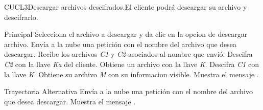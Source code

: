 
\begin{UseCase}{CUCL3}{Descargar archivos descifrados.}{El cliente podrá descargar su archivo y descifrarlo.}

\end{UseCase}


\begin{UCtrayectoria}{Principal}
\UCpaso [\UCactor] Selecciona el archivo a descargar y da clic en la opcion de descargar archivo.
\UCpaso [\UCactor] Envía a la nube una petición con el nombre del archivo que desea descargar.
\UCpaso Recibe los archivos \textit{C1} y \textit{C2} asociados al nombre que envió.
\UCpaso Descifra \textit{C2} con la llave \textit{Ka} del cliente.
\UCpaso Obtiene un archivo con la llave \textit{K}.
\UCpaso Descifra \textit{C1} con la llave \textit{K}.
\UCpaso Obtiene su archivo \textit{M} con su informacion visible.
\UCpaso Muestra el mensaje .
\end{UCtrayectoria}

\begin{UCtrayectoria}{Trayectoria Alternativa}
\UCpaso [\UCactor] Envía a la nube una petición con el nombre del archivo que desea descargar.
\UCpaso Muestra el mensaje .\end{UCtrayectoria}


